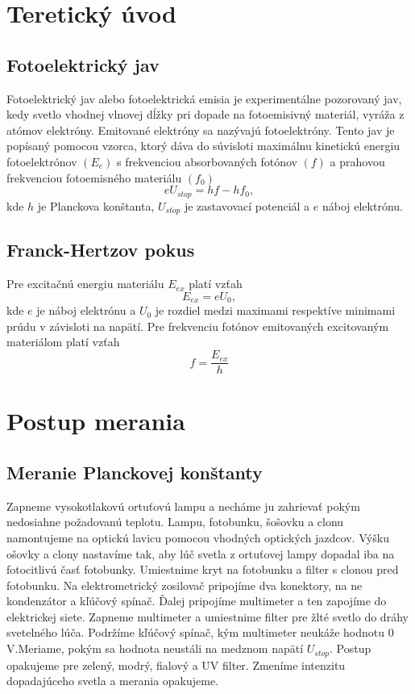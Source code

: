 \documentclass{article}
\begin{document}
\section{Teretický úvod}
\subsection{Fotoelektrický jav}
Fotoelektrický jav alebo fotoelektrická emisia  je experimentálne pozorovaný jav, kedy svetlo vhodnej vlnovej dĺžky pri dopade na fotoemisivný materiál, vyráža z atómov elektróny. Emitované elektróny sa nazývajú fotoelektróny. Tento jav je popísaný pomocou vzorca, ktorý dáva do súvisloti maximálnu kinetickú energiu fotoelektrónov $(E_e)$ s frekvenciou absorbovaných fotónov $(f)$ a prahovou frekvenciou fotoemisného materiálu $(f_0)$
\begin{equation}
eU_{stop}=hf-hf_0\label{eq:eU},
\end{equation} kde $h$ je Planckova konštanta, $U_{stop}$ je zastavovací potenciál a $e$ náboj elektrónu.  

\subsection{Franck-Hertzov pokus}
Pre excitačnú energiu materiálu $E_{ex}$ platí vzťah 
\begin{equation}
E_{ex}= eU_0\label{eq:Eex},
\end{equation}
kde $e$ je náboj elektrónu a $U_0$ je rozdiel medzi maximami respektíve minimami prúdu v závisloti na napätí.
Pre frekvenciu fotónov emitovaných excitovaným materiálom platí vzťah 
\begin{equation}
f=\frac{E_{ex}}{h}\label{eq:f}
\end{equation}


\section{Postup merania}
\subsection{Meranie Planckovej konštanty}
Zapneme vysokotlakovú ortuťovú lampu a necháme ju zahrievať pokým nedosiahne požadovanú teplotu. Lampu, fotobunku, šošovku a clonu namontujeme na optickú lavicu pomocou vhodných optických jazdcov. Výšku ošovky a clony nastavíme tak, aby lúč svetla z ortuťovej lampy dopadal iba na fotocitlivú časť fotobunky. Umiestnime kryt na fotobunku a filter s clonou pred fotobunku. Na elektrometrický zosilovač pripojíme dva konektory, na ne kondenzátor a kľúčový spínač. Ďalej pripojíme multimeter a ten zapojíme do elektrickej siete. Zapneme multimeter a umiestnime filter pre žlté svetlo do dráhy svetelného lúča. Podržíme kľúčový spínač, kým multimeter neukáže hodnotu 0 V.Meriame, pokým sa hodnota neustáli na medznom napätí $U_{stop}$. Postup opakujeme pre zelený, modrý, fialový a UV filter. Zmeníme intenzitu dopadajúceho svetla a merania opakujeme. 
\end{document}
